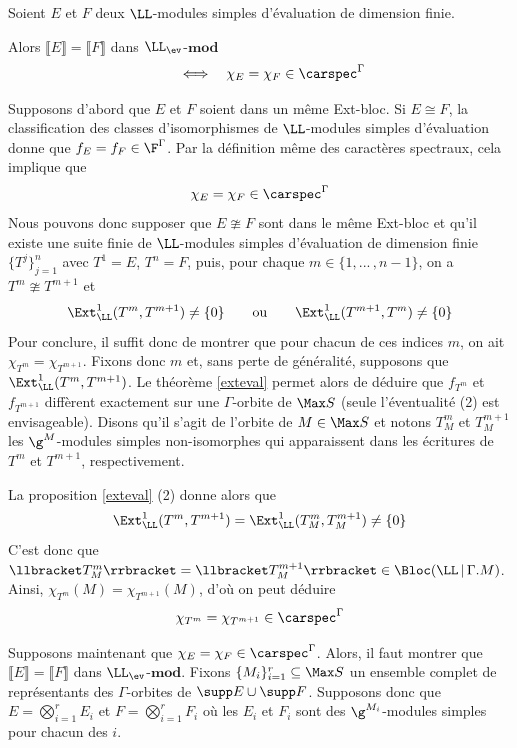 \begin{Prop} \label{extblocev} Soient $E$ et $F$ deux $\LL$-modules simples d'évaluation de dimension finie. 

Alors $\llbracket E \rrbracket = \llbracket F \rrbracket$ dans $\LL_{\ev}$-$\mathbf{mod}$
$$ \qquad \Longleftrightarrow \quad \chi_E = \chi_F \in \carspec^\Gamma $$
\begin{pre} Supposons d'abord que $E$ et $F$ soient dans un même Ext-bloc. Si $E \cong F$, la classification des classes d'isomorphismes de $\LL$-modules simples d'évaluation donne que \linebreak $f_E = f_F \in \F^\Gamma$. Par la définition même des caractères spectraux, cela implique que 
$$ \chi_E = \chi_F \in \carspec^\Gamma $$
Nous pouvons donc supposer que $E \ncong F$ sont dans le même Ext-bloc et qu'il existe une suite finie de $\LL$-modules simples d'évaluation de dimension finie $\{T^j\}_{j=1}^n$ avec $T^1 = E$, $T^n = F$, puis, pour chaque $m \in \{1,...\,,n-1\}$, on a $T^m \ncong T^{m+1}$ et
$$ \Ext^1_\LL(T^m,T^{m+1}) \neq \{0\} \qquad \text{ou} \qquad \Ext^1_\LL(T^{m+1},T^m) \neq \{0\} $$
Pour conclure, il suffit donc de montrer que pour chacun de ces indices $m$, on ait $\chi_{T^m} = \chi_{T^{m+1}}$. Fixons donc $m$ et, sans perte de généralité, supposons que $\Ext^1_\LL(T^m,T^{m+1})$. Le théorème \ref{exteval} permet alors de déduire que $f_{T^m}$ et $f_{T^{m+1}}$ diffèrent exactement sur une $\Gamma$-orbite de $\Max S$ (seule l'éventualité (2) est envisageable). Disons qu'il s'agit de l'orbite de $M \in \Max S$ et notons $T^m_M$ et $T^{m+1}_M$ les $\g^M$-modules simples non-isomorphes qui apparaissent dans les écritures de $T^m$ et $T^{m+1}$, respectivement. 

La proposition \ref{exteval} (2) donne alors que 
$$ \Ext^1_\LL(T^m,T^{m+1}) = \Ext^1_\LL(T^m_M,T^{m+1}_M) \neq \{0\} $$
C'est donc que $\llbracket T^m_M \rrbracket = \llbracket T^{m+1}_M \rrbracket \in \Bloc(\LL \, | \, \Gamma.M)$. Ainsi, $\chi_{T^m}(M) = \chi_{T^{m+1}}(M)$, d'où on peut déduire
$$ \chi_{T^m} = \chi_{T^{m+1}} \in \carspec^\Gamma $$

Supposons maintenant que $\chi_E = \chi_F \in \carspec^\Gamma$. Alors, il faut montrer que $\llbracket E \rrbracket = \llbracket F \rrbracket$ dans $\LL_{\ev}$-$\mathbf{mod}$. Fixons $\{M_i\}_{i=1}^r \subseteq \Max S$ un ensemble complet de représentants des $\Gamma$-orbites de $\supp E \cup \supp F$. Supposons donc que $E = \bigotimes_{i=1}^r E_i$ et  $F = \bigotimes_{i=1}^r F_i$ où les $E_i$ et $F_i$ sont des $\g^{M_i}$-modules simples pour chacun des $i$.


\end{pre}
\end{Prop}
